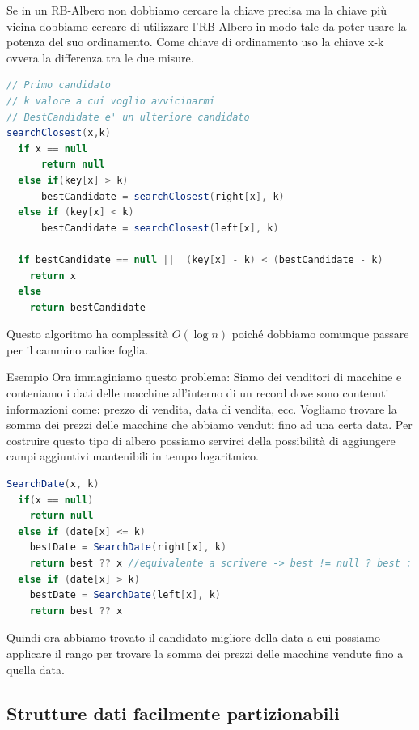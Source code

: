 \documentclass[a4paper]{article}
\begin{document}
Se in un RB-Albero non dobbiamo cercare la chiave precisa ma la chiave più vicina dobbiamo cercare di utilizzare l'RB Albero
in modo tale da poter usare la potenza del suo ordinamento.
Come chiave di ordinamento uso la chiave x-k ovvera la differenza tra le due misure.

\begin{lstlisting}[language = Scala]
// Primo candidato
// k valore a cui voglio avvicinarmi
// BestCandidate e' un ulteriore candidato
searchClosest(x,k) 
  if x == null
      return null
  else if(key[x] > k)
      bestCandidate = searchClosest(right[x], k)
  else if (key[x] < k)
      bestCandidate = searchClosest(left[x], k)

  if bestCandidate == null ||  (key[x] - k) < (bestCandidate - k) 
    return x
  else 
    return bestCandidate
\end{lstlisting}
Questo algoritmo ha complessità $O(\log n)$ poiché dobbiamo comunque passare per il cammino radice foglia.

\begin{examplebox}{Esempio}
Ora immaginiamo questo problema: Siamo dei venditori di macchine e conteniamo i dati delle macchine all'interno 
di un record dove sono contenuti informazioni come: prezzo di vendita, data di vendita, ecc. Vogliamo trovare la somma dei prezzi delle macchine che abbiamo venduti fino ad una certa data.
Per costruire questo tipo di albero possiamo servirci della possibilità di aggiungere campi aggiuntivi mantenibili in tempo logaritmico.
\begin{lstlisting}[language = Scala]
SearchDate(x, k)
  if(x == null) 
    return null
  else if (date[x] <= k) 
    bestDate = SearchDate(right[x], k)
    return best ?? x //equivalente a scrivere -> best != null ? best : x
  else if (date[x] > k) 
    bestDate = SearchDate(left[x], k)
    return best ?? x
\end{lstlisting}
Quindi ora abbiamo trovato il candidato migliore della data a cui possiamo applicare il rango per trovare la somma dei prezzi delle macchine vendute fino a quella data.

\end{examplebox}

\subsection{Strutture dati facilmente partizionabili}
\end{document}
